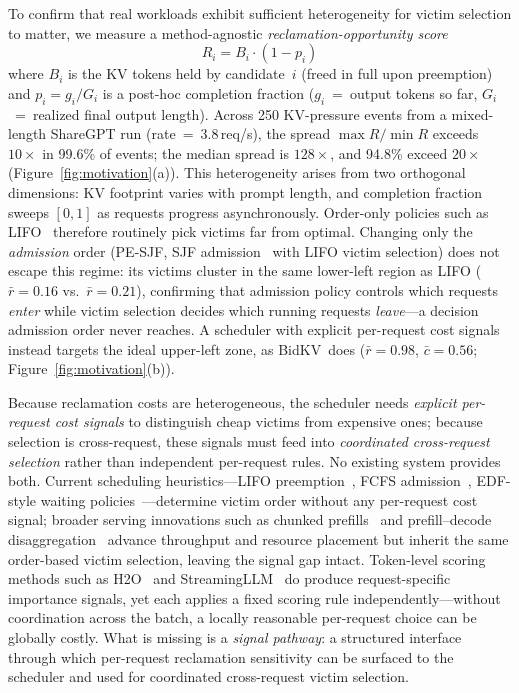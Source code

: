 \documentclass[sigconf,nonacm]{acmart}
\newcommand{\bidkv}{BidKV\xspace}
\begin{document}
To confirm that real workloads exhibit sufficient heterogeneity for victim
selection to matter, we measure a method-agnostic
\emph{reclamation-opportunity score}
\begin{equation}
R_i = B_i \cdot (1 - p_i)
\label{eq:reclamation_opportunity}
\end{equation}
where $B_i$ is the KV tokens held by candidate~$i$ (freed in full upon
preemption) and $p_i = g_i / G_i$ is a post-hoc completion fraction
($g_i$~=~output tokens so far, $G_i$~=~realized final output length).
Across 250 KV-pressure events from a mixed-length ShareGPT run
(rate~=~3.8\,req/s), the spread $\max R / \min R$ exceeds $10{\times}$ in
99.6\% of events; the median spread is $128{\times}$, and 94.8\% exceed
$20{\times}$ (Figure~\ref{fig:motivation}(a)).
This heterogeneity arises from two orthogonal dimensions: KV footprint varies
with prompt length, and completion fraction sweeps $[0,1]$ as requests
progress asynchronously.
Order-only policies such as LIFO~\cite{Kwon2023} therefore routinely pick
victims far from optimal.
Changing only the \emph{admission} order (PE-SJF, SJF
admission~\cite{Bansal2001SRPT} with LIFO victim selection) does not escape
this regime: its victims cluster in the same lower-left region as LIFO
($\bar{r}\!=\!0.16$ vs.\ $\bar{r}\!=\!0.21$), confirming that admission
policy controls which requests \emph{enter} while victim selection decides
which running requests \emph{leave}---a decision admission order never
reaches.
A scheduler with explicit per-request cost signals instead targets the ideal
upper-left zone, as \bidkv\ does ($\bar{r}\!=\!0.98$, $\bar{c}\!=\!0.56$;
Figure~\ref{fig:motivation}(b)).

Because reclamation costs are heterogeneous, the scheduler needs
\emph{explicit per-request cost signals} to distinguish cheap victims from
expensive ones; because selection is cross-request, these signals must feed
into \emph{coordinated cross-request selection} rather than independent
per-request rules.  No existing system provides both.  Current scheduling
heuristics---LIFO preemption~\cite{Kwon2023}, FCFS
admission~\cite{Yu2022}, EDF-style waiting
policies~\cite{Gujarati2020}---determine victim order without any
per-request cost signal; broader serving innovations such as chunked
prefills~\cite{Agrawal2024sarathiserve} and prefill--decode
disaggregation~\cite{Zhong2024, Patel2024} advance throughput and resource
placement but inherit the same order-based victim selection, leaving the
signal gap intact.  Token-level scoring methods such as
H2O~\cite{Zhang2023h2o} and StreamingLLM~\cite{Xiao2024} do produce
request-specific importance signals, yet each applies a fixed scoring rule
independently---without coordination across the batch, a locally reasonable
per-request choice can be globally costly.  What is missing is a
\emph{signal pathway}: a structured interface through which per-request
reclamation sensitivity can be surfaced to the scheduler and used for
coordinated cross-request victim selection.
\end{document}
